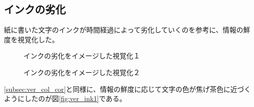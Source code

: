 \subsection{インクの劣化}
\label{subsec:ver_col_ink}

紙に書いた文字のインクが時間経過によって劣化していくのを参考に、情報の鮮度を視覚化した。

\begin{figure}[htbp]
  \begin{minipage}{0.5\hsize}
    \begin{center}
    \end{center}
    \caption{インクの劣化をイメージした視覚化１}
    \label{fig:ver_ink1}
  \end{minipage}
  \begin{minipage}{0.5\hsize}
    \begin{center}
    \end{center}
    \caption{インクの劣化をイメージした視覚化２}
    \label{fig:ver_ink2}
  \end{minipage}
\end{figure}

\ref{subsec:ver_col_cor}と同様に、情報の鮮度に応じて文字の色が焦げ茶色に近づくようにしたのが図\ref{fig:ver_ink1}である。

